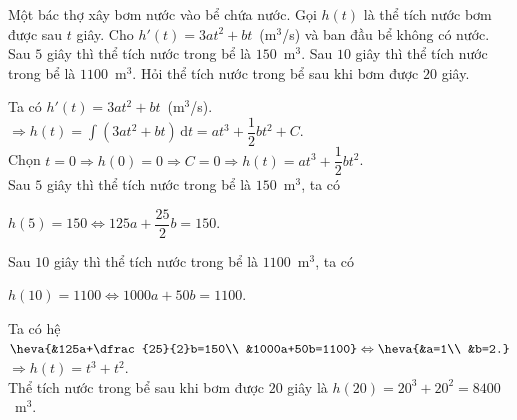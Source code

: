 \begin{ex}%
Một bác thợ xây bơm nước vào bể chứa nước. Gọi $h(t)$ là thể tích nước bơm được sau $t$ giây. Cho $h'(t)=3at^2+bt$~(m$^3$/s) và ban đầu bể không có nước. Sau $5$ giây thì thể tích nước trong bể là $150$~m$^3$. Sau	$10$ giây thì thể tích nước trong bể là $1100$~m$^3$. Hỏi thể tích nước trong bể sau khi bơm được $20$ giây.
\loigiai
{
Ta có $h'(t)=3at^2+bt$~(m$^3$/s).\\
$\Rightarrow h(t)=\displaystyle\int (3at^2+bt)\mathrm{\,d}t=at^3+\dfrac{1}{2}bt^2+C$.\\
Chọn $t=0\Rightarrow h(0)=0\Rightarrow C=0\Rightarrow h(t)=at^3+\dfrac{1}{2}bt^2$.\\
Sau $5$ giây thì thể tích nước trong bể là $150$~m$^3$, ta có\\ \centerline{$h(5)=150\Leftrightarrow 125a+\dfrac{25}{2}b=150.$}
Sau $10$ giây thì thể tích nước trong bể là $1100$~m$^3$, ta có\\
\centerline{$h(10)=1100\Leftrightarrow 1000a+50b=1100.$}
Ta có hệ $\heva{&125a+\dfrac{25}{2}b=150\\ &1000a+50b=1100}\Leftrightarrow \heva{&a=1\\ &b=2.}$\\
$\Rightarrow h(t)=t^3+t^2$.\\
Thể tích nước trong bể sau khi bơm được $20$ giây là $h(20)=20^3+20^2=8400$~m$^3$.
}
\end{ex}

